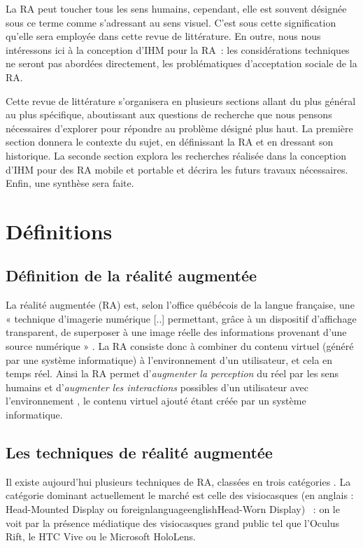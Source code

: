 La RA peut toucher tous les sens humains, cependant, elle est souvent désignée sous ce terme comme s'adressant au sens visuel. C'est sous cette signification qu'elle sera employée dans cette revue de littérature. En outre, nous nous intéressons ici à la conception d'IHM pour la RA~: les considérations techniques ne seront pas abordées directement, les problématiques d'acceptation sociale de la RA.

Cette revue de littérature s'organisera en plusieurs sections allant du plus général au plus spécifique, aboutissant aux questions de recherche que nous pensons nécessaires d'explorer pour répondre au problème désigné plus haut. La première section donnera le contexte du sujet, en définissant la RA et en dressant son historique. La seconde section explora les recherches réalisée dans la conception d'IHM pour des RA mobile et portable et décrira les futurs travaux nécessaires. Enfin, une synthèse sera faite.

\section*{Définitions}
\subsection*{Définition de la réalité augmentée}
La réalité augmentée (RA) est, selon l'office québécois de la langue française, une « technique d'imagerie numérique [..] permettant, grâce à un dispositif d'affichage transparent, de superposer à une image réelle des informations provenant d'une source numérique » \citep{OfficeQuebecoisLangueFrancaiseRA2015}. La RA consiste donc à combiner du contenu virtuel (généré par une système informatique) à l'environnement d'un utilisateur, et cela en temps réel. Ainsi la RA permet d'\emph{augmenter la perception} du réel par les sens humains et d'\emph{augmenter les interactions} possibles d'un utilisateur avec l'environnement \citep{Azuma1997}, le contenu virtuel ajouté étant créée par un système informatique.

\subsection*{Les techniques de réalité augmentée}
Il existe aujourd'hui plusieurs techniques de RA, classées en trois catégories . La catégorie dominant actuellement le marché est celle des visiocasques (en anglais : \foreignlanguage{english}{Head-Mounted Display} ou foreignlanguage{english}{Head-Worn Display}) \citep{VanKrevelenPoelman2010}~: on le voit par la présence médiatique des visiocasques grand public tel que l'Oculus Rift, le HTC Vive ou le Microsoft HoloLens.

